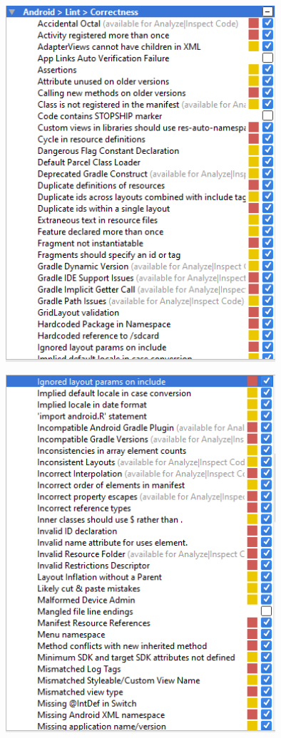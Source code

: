 \begin{figure}[H]
  		\centering
      	\includegraphics[width=100mm]{Capture11}	      	
  		\caption{}
\end{figure}

\begin{figure}[H]
  		\centering
      	\includegraphics[width=100mm]{Capture12}	      	
  		\caption{}
\end{figure}

